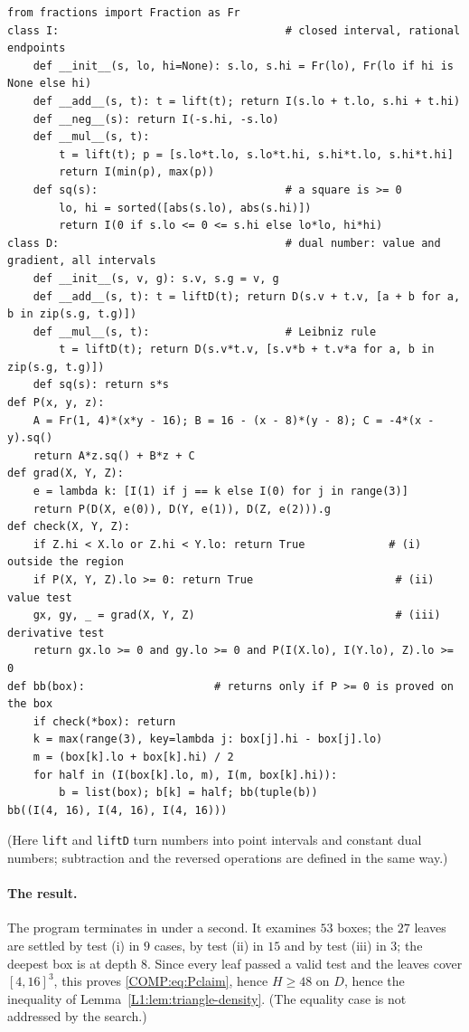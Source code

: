 \documentclass[11pt,openany]{book}
\theoremstyle{plain}
\theoremstyle{definition}
\theoremstyle{remark}
\begin{document}
{\footnotesize
\begin{verbatim}
from fractions import Fraction as Fr
class I:                                   # closed interval, rational endpoints
    def __init__(s, lo, hi=None): s.lo, s.hi = Fr(lo), Fr(lo if hi is None else hi)
    def __add__(s, t): t = lift(t); return I(s.lo + t.lo, s.hi + t.hi)
    def __neg__(s): return I(-s.hi, -s.lo)
    def __mul__(s, t):
        t = lift(t); p = [s.lo*t.lo, s.lo*t.hi, s.hi*t.lo, s.hi*t.hi]
        return I(min(p), max(p))
    def sq(s):                             # a square is >= 0
        lo, hi = sorted([abs(s.lo), abs(s.hi)])
        return I(0 if s.lo <= 0 <= s.hi else lo*lo, hi*hi)
class D:                                   # dual number: value and gradient, all intervals
    def __init__(s, v, g): s.v, s.g = v, g
    def __add__(s, t): t = liftD(t); return D(s.v + t.v, [a + b for a, b in zip(s.g, t.g)])
    def __mul__(s, t):                     # Leibniz rule
        t = liftD(t); return D(s.v*t.v, [s.v*b + t.v*a for a, b in zip(s.g, t.g)])
    def sq(s): return s*s
def P(x, y, z):
    A = Fr(1, 4)*(x*y - 16); B = 16 - (x - 8)*(y - 8); C = -4*(x - y).sq()
    return A*z.sq() + B*z + C
def grad(X, Y, Z):
    e = lambda k: [I(1) if j == k else I(0) for j in range(3)]
    return P(D(X, e(0)), D(Y, e(1)), D(Z, e(2))).g
def check(X, Y, Z):
    if Z.hi < X.lo or Z.hi < Y.lo: return True             # (i)   outside the region
    if P(X, Y, Z).lo >= 0: return True                      # (ii)  value test
    gx, gy, _ = grad(X, Y, Z)                               # (iii) derivative test
    return gx.lo >= 0 and gy.lo >= 0 and P(I(X.lo), I(Y.lo), Z).lo >= 0
def bb(box):                    # returns only if P >= 0 is proved on the box
    if check(*box): return
    k = max(range(3), key=lambda j: box[j].hi - box[j].lo)
    m = (box[k].lo + box[k].hi) / 2
    for half in (I(box[k].lo, m), I(m, box[k].hi)):
        b = list(box); b[k] = half; bb(tuple(b))
bb((I(4, 16), I(4, 16), I(4, 16)))
\end{verbatim}
}
\noindent (Here \texttt{lift} and \texttt{liftD} turn numbers into point intervals and constant dual
numbers; subtraction and the reversed operations are defined in the same way.)

\paragraph{The result.} The program terminates in under a second. It examines $53$ boxes; the $27$ leaves
are settled by test (i) in $9$ cases, by test (ii) in $15$ and by test (iii) in $3$; the deepest box is at
depth $8$. Since every leaf passed a valid test and the leaves cover $[4,16]^3$, this proves
\eqref{COMP:eq:Pclaim}, hence $H\ge48$ on $D$, hence the inequality of
Lemma~\ref{L1:lem:triangle-density}. (The equality case is not addressed by the search.)
\end{document}
